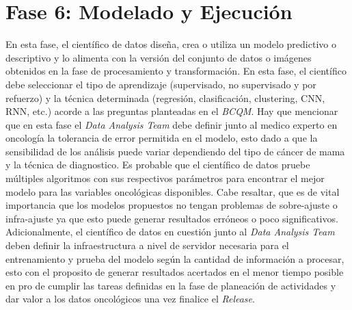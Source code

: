 \section{Fase 6: Modelado y Ejecución}
En esta fase, el científico de datos diseña, crea o utiliza un modelo predictivo o descriptivo y lo alimenta con la versión del conjunto de datos o imágenes obtenidos en la fase de procesamiento y transformación. En esta fase, el científico debe seleccionar el tipo de aprendizaje (supervisado, no supervisado y por refuerzo) y la técnica determinada (regresión, clasificación, clustering, CNN, RNN, etc.) acorde a las preguntas planteadas en el \textit{BCQM}. Hay que mencionar que en esta fase el \textit{Data Analysis Team} debe definir junto al medico experto en oncología la tolerancia de error permitida en el modelo, esto dado a que la sensibilidad de los análisis puede variar dependiendo del tipo de cáncer de mama y la técnica de diagnostico. Es probable que el científico de datos pruebe múltiples algoritmos con sus respectivos parámetros para encontrar el mejor modelo para las variables oncológicas disponibles. Cabe resaltar, que es de vital importancia que los modelos propuestos no tengan problemas de sobre-ajuste o infra-ajuste ya que esto puede generar resultados erróneos o poco significativos. Adicionalmente, el científico de datos en cuestión junto al \textit{Data Analysis Team} deben definir la infraestructura a nivel de servidor necesaria para el entrenamiento y prueba del modelo según la cantidad de información a procesar, esto con el proposito de generar resultados acertados en el menor tiempo posible en pro de cumplir las tareas definidas en la fase de planeación de actividades y dar valor a los datos oncológicos una vez finalice el \textit{Release}.


